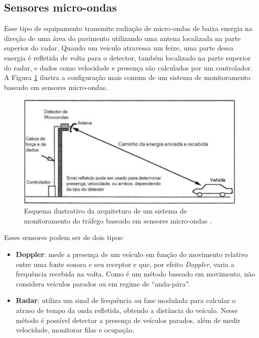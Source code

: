 
\subsection{Sensores micro-ondas} %
\label{sub:radar_por_microondas}

Esse tipo de equipamento transmite radiação de micro-ondas de baixa energia na direção de uma área do pavimento utilizando uma antena localizada na parte superior do radar. Quando um veículo atravessa um feixe, uma parte dessa energia é refletida de volta para o detector, também localizado na parte superior do radar, e dados como velocidade e presença são calculados por um controlador. A Figura \ref{fig:microondas} ilustra a configuração mais comum de um sistema de monitoramento baseado em sensores micro-ondas.

\begin{figure}[ht]
  \begin{center}
    \includegraphics[scale=.6]{imgs/microondas.png}
  \end{center}
  \caption{Esquema ilustrativo da arquitetura de um sistema de monitoramento do tráfego baseado em sensores micro-ondas \citep{goldner:2009:misc}.}
  \label{fig:microondas}
\end{figure}

Esses sensores podem ser de dois tipos:

\begin{itemize}
  \item \textbf{Doppler}: mede a presença de um veículo em função do movimento relativo entre uma fonte sonora e seu receptor e que, por efeito \textit{Doppler}, varia a frequência recebida na volta. Como é um método baseado em movimento, não considera veículos parados ou em regime de ``anda-pára''.
  \item \textbf{Radar}: utiliza um sinal de frequência ou fase modulada para calcular o atraso de tempo da onda refletida, obtendo a distância do veículo. Nesse método é possível detectar a presença de veículos parados, além de medir velocidade, monitorar filas e ocupação.
\end{itemize}


